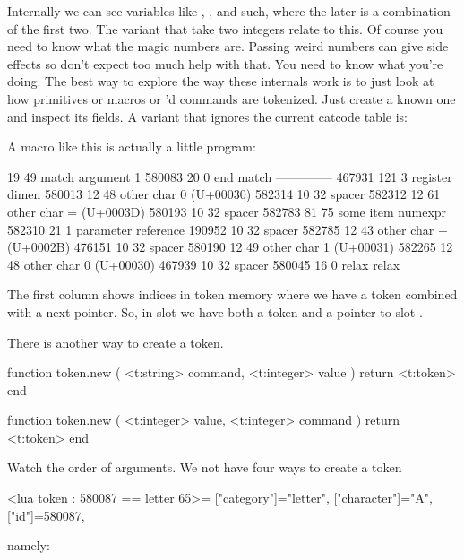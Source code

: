 Internally we can see variables like , ,  and
such, where the later is a combination of the first two. The 
variant that take two integers relate to this. Of course you need to know what
the magic numbers are. Passing weird numbers can give side effects so don't
expect too much help with that. You need to know what you're doing. The best way
to explore the way these internals work is to just look at how primitives or
macros or \type {\chardef}'d commands are tokenized. Just create a known one and
inspect its fields. A variant that ignores the current catcode table is:

\startbuffer
\protected{}
\stopbuffer

\typebuffer %

A macro like this is actually a little program:

   19   49  match                argument 1
580083   20    0  end match
--------------
467931  121    3  register             dimen
580013   12   48  other char           0 (U+00030)
582314   10   32  spacer
582312   12   61  other char           = (U+0003D)
580193   10   32  spacer
582783   81   75  some item            numexpr
582310   21    1  parameter reference
190952   10   32  spacer
582785   12   43  other char           + (U+0002B)
476151   10   32  spacer
580190   12   49  other char           1 (U+00031)
582265   12   48  other char           0 (U+00030)
467939   10   32  spacer
580045   16    0  relax                relax
\stoptyping

The first column shows indices in token memory where we have a token combined
with a next pointer. So, in slot  we have both a token and a
pointer to slot .

There is another way to create a token.

\starttyping[option=LUA]
function token.new ( <t:string> command, <t:integer> value )
    return <t:token>
end

function token.new ( <t:integer> value, <t:integer> command )
    return <t:token>
end
\stoptyping

Watch the order of arguments. We not have four ways to create a token

\starttyping[option=LUA]
<lua token : 580087 == letter 65>={
 ["category"]="letter",
 ["character"]="A",
 ["id"]=580087,
}
\stoptyping

namely:

